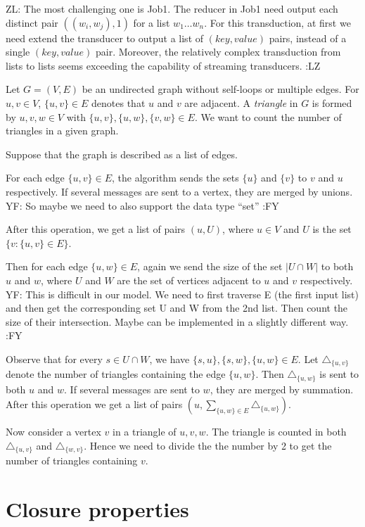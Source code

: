 \documentclass[11pt]{article}
\newcommand{\yfc}[1]{\color{blue} {YF: #1 :FY} \color{black}}
\newcommand{\zhilin}[1]{\color{cyan} {ZL: #1 :LZ} \color{black}}
\begin{document}
\zhilin{The most challenging one is Job1. The reducer in Job1 need output each distinct pair $((w_i, w_j),1)$ for a list $w_1 \dots w_n$. For this transduction, at first we need extend the transducer to output a list of $(key, value)$ pairs, instead of a single $(key,value)$ pair. Moreover, the relatively complex transduction from lists to lists seems exceeding the capability of streaming transducers.}

\newcommand{\numTri}[1]{\triangle_{#1}}
Let $G = (V, E)$ be an undirected graph without self-loops or multiple
edges. For $u, v \in V$, $\{ u, v \} \in E$ denotes that $u$ and $v$
are adjacent. A  \emph{triangle} in $G$ is formed by $u, v, w \in V$ with $\{ u, v \},
\{ u, w \}, \{ v, w \} \in E$. 
We want to count the number of triangles in a given graph.

Suppose that the graph is described as a list of edges.

For each edge $\{ u, v \} \in E$, the algorithm sends the sets $\{ u \}$
and $\{ v \}$ to $v$ and $u$ respectively. If several messages are
sent to a vertex, they are merged by unions.
\yfc{So maybe we need to also support the data type ``set''}

After this operation, we get a list of pairs $(u, U)$, where $u \in V$ and $U$ is the set $\{ v : \{ u, v \} \in E \}$.

Then for each edge $\{ u, w \} \in E$, again we send the size of the set $| U \cap W |$ to both $u$ and $w$, where $U$ and $W$ are
the set of vertices adjacent to $u$ and $v$ respectively. 
\yfc{This is difficult in our model. We need to first traverse E (the first input list) and then get the corresponding set U and W from the 2nd list. Then count the size of their intersection. Maybe can be implemented in a slightly different way.}

Observe that for every $s \in U \cap W$, we have $\{ s, u \}, \{ s, w \}, \{ u, w
\} \in E$. Let $\numTri{\{u, v\}}$ denote the number of triangles
containing the edge $\{ u, w \}$. Then $\numTri{\{u, w\}}$ is sent to
both $u$ and $w$. If several messages are sent to $w$, they are merged
by summation. After this operation we get a list of pairs $(u, \sum_{\{ u, w \} \in E} \numTri{\{u, w\}})$.

Now consider a vertex $v$ in a triangle of $u, v, w$. The triangle is
counted in both $\numTri{\{ u, v \}}$ and $\numTri{\{ w, v \}}$. Hence
we need to divide the the number by 2 to get the number of triangles containing $v$. 


\section{Closure properties}
\end{document}
